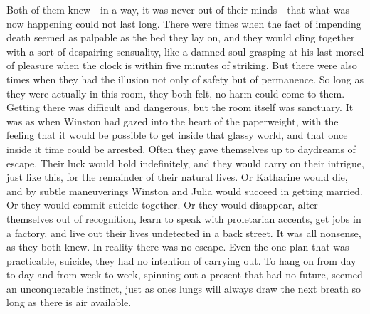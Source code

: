 Both of them knew---in a way, it was never out of their minds---that
what was now happening could not last long. There were times when the
fact of impending death seemed as palpable as the bed they lay on, and
they would cling together with a sort of despairing sensuality, like a
damned soul grasping at his last morsel of pleasure when the clock is
within five minutes of striking. But there were also times when they had
the illusion not only of safety but of permanence. So long as they were
actually in this room, they both felt, no harm could come to them.
Getting there was difficult and dangerous, but the room itself was
sanctuary. It was as when Winston had gazed into the heart of the
paperweight, with the feeling that it would be possible to get inside
that glassy world, and that once inside it time could be arrested. Often
they gave themselves up to daydreams of escape. Their luck would hold
indefinitely, and they would carry on their intrigue, just like this,
for the remainder of their natural lives. Or Katharine would die, and by
subtle maneuverings Winston and Julia would succeed in getting married.
Or they would commit suicide together. Or they would disappear, alter
themselves out of recognition, learn to speak with proletarian accents,
get jobs in a factory, and live out their lives undetected in a back
street. It was all nonsense, as they both knew. In reality there was no
escape. Even the one plan that was practicable, suicide, they had no
intention of carrying out. To hang on from day to day and from week to
week, spinning out a present that had no future, seemed an unconquerable
instinct, just as one\textquotesingle s lungs will always draw the next
breath so long as there is air available.

